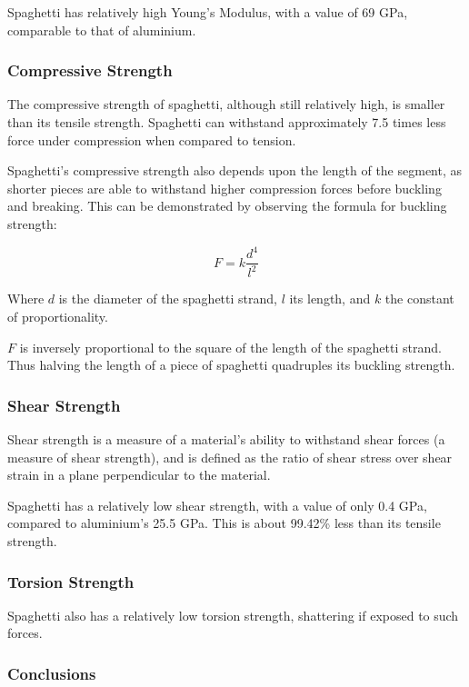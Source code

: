 \documentclass[a4paper,11pt]{article}
\begin{document}
Spaghetti has relatively high Young's Modulus, with a value of 69 GPa,
comparable to that of aluminium.


\subsubsection{Compressive Strength}

The compressive strength of spaghetti, although still relatively high, is
smaller than its tensile strength.
Spaghetti can withstand approximately 7.5 times less force under compression
when compared to tension.

Spaghetti's compressive strength also depends upon the length of the segment, as
shorter pieces are able to withstand higher compression forces before buckling
and breaking.
This can be demonstrated by observing the formula for buckling strength:

$$
F = k \frac{d^4}{l^2}
$$

Where $d$ is the diameter of the spaghetti strand, $l$ its length, and $k$ the
constant of proportionality.

$F$ is inversely proportional to the square of the length of the spaghetti
strand.
Thus halving the length of a piece of spaghetti quadruples its buckling
strength.


\subsubsection{Shear Strength}

Shear strength is a measure of a material's ability to withstand shear forces (a
measure of shear strength), and is defined as the ratio of shear stress over
shear strain in a plane perpendicular to the material.

Spaghetti has a relatively low shear strength, with a value of only 0.4 GPa,
compared to aluminium's 25.5 GPa.
This is about 99.42\% less than its tensile strength.


\subsubsection{Torsion Strength}

Spaghetti also has a relatively low torsion strength, shattering if exposed to
such forces.


\subsubsection{Conclusions}
\end{document}
